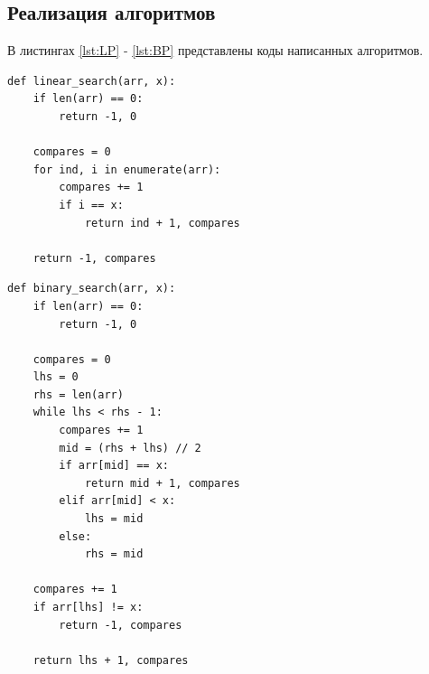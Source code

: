\documentclass{article}
\begin{document}
\subsection{Реализация алгоритмов}
В листингах \ref{lst:LP} - \ref{lst:BP} представлены коды написанных алгоритмов.

\begin{lstlisting}[style=python, label=lst:LP,caption=Алгоритм линейного поиска в массиве]
def linear_search(arr, x):
    if len(arr) == 0:
        return -1, 0

    compares = 0
    for ind, i in enumerate(arr):
        compares += 1
        if i == x:
            return ind + 1, compares

    return -1, compares
\end{lstlisting}

\clearpage\begin{lstlisting}[style=python, label=lst:BP,caption=Алгоритм бинарного поиска в массиве]
def binary_search(arr, x):
    if len(arr) == 0:
        return -1, 0

    compares = 0
    lhs = 0
    rhs = len(arr)
    while lhs < rhs - 1:
        compares += 1
        mid = (rhs + lhs) // 2
        if arr[mid] == x:
            return mid + 1, compares
        elif arr[mid] < x:
            lhs = mid
        else:
            rhs = mid

    compares += 1
    if arr[lhs] != x:
        return -1, compares

    return lhs + 1, compares
\end{lstlisting}
\end{document}
